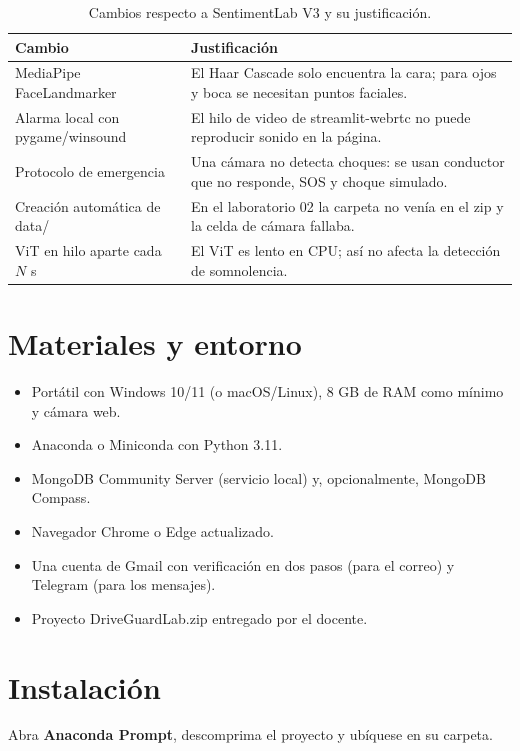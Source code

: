 \documentclass[11pt,a4paper]{article}
\newcommand{\codigoguion}{\textunderscore\allowbreak}
\newcommand{\codigo}[1]{{\small\ttfamily\let\_\codigoguion #1}}
\begin{document}
\begin{table}[H]
\centering
\caption{Cambios respecto a SentimentLab V3 y su justificación.}
\begin{tabularx}{\textwidth}{>{\raggedright}p{3.6cm} X}
\toprule
\textbf{Cambio} & \textbf{Justificación}\\
\midrule
MediaPipe FaceLandmarker & El Haar Cascade solo encuentra la cara; para ojos y boca se necesitan puntos faciales.\\
Alarma local con pygame/winsound & El hilo de video de streamlit-webrtc no puede reproducir sonido en la página.\\
Protocolo de emergencia & Una cámara no detecta choques: se usan conductor que no responde, SOS y choque simulado.\\
Creación automática de \codigo{data/} & En el laboratorio 02 la carpeta no venía en el zip y la celda de cámara fallaba.\\
ViT en hilo aparte cada $N$ s & El ViT es lento en CPU; así no afecta la detección de somnolencia.\\
\bottomrule
\end{tabularx}
\end{table}

\section{Materiales y entorno}
\begin{itemize}
  \item Portátil con Windows 10/11 (o macOS/Linux), 8 GB de RAM como mínimo y cámara web.
  \item Anaconda o Miniconda con Python 3.11.
  \item MongoDB Community Server (servicio local) y, opcionalmente, MongoDB Compass.
  \item Navegador Chrome o Edge actualizado.
  \item Una cuenta de Gmail con verificación en dos pasos (para el correo) y Telegram (para los mensajes).
  \item Proyecto \codigo{DriveGuardLab.zip} entregado por el docente.
\end{itemize}

\section{Instalación}
Abra \textbf{Anaconda Prompt}, descomprima el proyecto y ubíquese en su carpeta.
\end{document}
